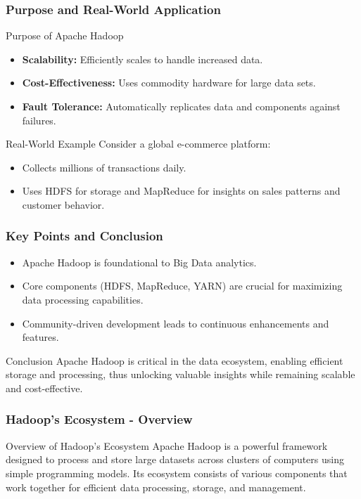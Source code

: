 \documentclass[aspectratio=169]{beamer}
\begin{document}
\begin{frame}[fragile]
    \frametitle{Purpose and Real-World Application}
    \begin{block}{Purpose of Apache Hadoop}
        \begin{itemize}
            \item \textbf{Scalability:} Efficiently scales to handle increased data.
            \item \textbf{Cost-Effectiveness:} Uses commodity hardware for large data sets.
            \item \textbf{Fault Tolerance:} Automatically replicates data and components against failures.
        \end{itemize}
    \end{block}
    
    \begin{block}{Real-World Example}
        Consider a global e-commerce platform:
        \begin{itemize}
            \item Collects millions of transactions daily.
            \item Uses HDFS for storage and MapReduce for insights on sales patterns and customer behavior.
        \end{itemize}
    \end{block}
\end{frame}

\begin{frame}[fragile]
    \frametitle{Key Points and Conclusion}
    \begin{itemize}
        \item Apache Hadoop is foundational to Big Data analytics.
        \item Core components (HDFS, MapReduce, YARN) are crucial for maximizing data processing capabilities.
        \item Community-driven development leads to continuous enhancements and features.
    \end{itemize}

    \begin{block}{Conclusion}
        Apache Hadoop is critical in the data ecosystem, enabling efficient storage and processing, thus unlocking valuable insights while remaining scalable and cost-effective.
    \end{block}
\end{frame}

\begin{frame}[fragile]
    \frametitle{Hadoop's Ecosystem - Overview}
    \begin{block}{Overview of Hadoop's Ecosystem}
        Apache Hadoop is a powerful framework designed to process and store large datasets across clusters of computers using simple programming models. Its ecosystem consists of various components that work together for efficient data processing, storage, and management.
    \end{block}
\end{frame}
\end{document}
